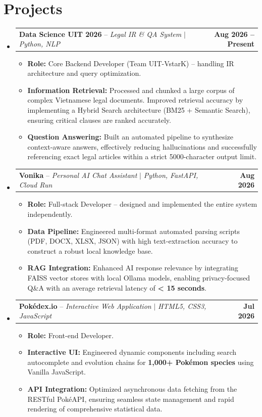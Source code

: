 \documentclass[letterpaper,11pt]{article}
\makeatletter
\newcommand{\resumeItem}[1]{
  \item\small{
    {#1 \vspace{-2pt}}
  }
}
\newcommand{\resumeProjectHeading}[2]{
    \item
    \begin{tabular*}{1.0\textwidth}{l@{\extracolsep{\fill}}r}
      \small#1 & \textbf{#2} \\
    \end{tabular*}\vspace{-7pt}
}
\newcommand{\resumeSubHeadingListStart}{\begin{itemize}[leftmargin=0.0in, label={}]}
\newcommand{\resumeSubHeadingListEnd}{\end{itemize}}
\newcommand{\resumeItemListStart}{\begin{itemize}}
\newcommand{\resumeItemListEnd}{\end{itemize}\vspace{-5pt}}
\makeatother
\begin{document}
\section{Projects}
    \resumeSubHeadingListStart
      \resumeProjectHeading
          {\textbf{Data Science UIT 2026} -- \emph{Legal IR \& QA System} $|$ \emph{Python, NLP}}{Aug 2026 -- Present}
          \resumeItemListStart
            \resumeItem{\textbf{Role:} Core Backend Developer (Team UIT-VstarK) -- handling IR architecture and query optimization.}
            \resumeItem{\textbf{Information Retrieval:} Processed and chunked a large corpus of complex Vietnamese legal documents. Improved retrieval accuracy by implementing a Hybrid Search architecture (BM25 + Semantic Search), ensuring critical clauses are ranked accurately.}
            \resumeItem{\textbf{Question Answering:} Built an automated pipeline to synthesize context-aware answers, effectively reducing hallucinations and successfully referencing exact legal articles within a strict 5000-character output limit.}
          \resumeItemListEnd
          
      \resumeProjectHeading
          {\textbf{Vonika} -- \emph{Personal AI Chat Assistant} $|$ \emph{Python, FastAPI, Cloud Run}}{Aug 2026}
          \resumeItemListStart
            \resumeItem{\textbf{Role:} Full-stack Developer -- designed and implemented the entire system independently.}
            \resumeItem{\textbf{Data Pipeline:} Engineered multi-format automated parsing scripts (PDF, DOCX, XLSX, JSON) with high text-extraction accuracy to construct a robust local knowledge base.}
            \resumeItem{\textbf{RAG Integration:} Enhanced AI response relevance by integrating FAISS vector stores with local Ollama models, enabling privacy-focused Q\&A with an average retrieval latency of \textbf{< 15 seconds}.}
          \resumeItemListEnd
          
      \resumeProjectHeading
          {\textbf{Pokédex.io} -- \emph{Interactive Web Application} $|$ \emph{HTML5, CSS3, JavaScript}}{Jul 2026}
          \resumeItemListStart
            \resumeItem{\textbf{Role:} Front-end Developer.}
            \resumeItem{\textbf{Interactive UI:} Engineered dynamic components including search autocomplete and evolution chains for \textbf{1,000+ Pokémon species} using Vanilla JavaScript.}
            \resumeItem{\textbf{API Integration:} Optimized asynchronous data fetching from the RESTful PokéAPI, ensuring seamless state management and rapid rendering of comprehensive statistical data.}
          \resumeItemListEnd
    \resumeSubHeadingListEnd
\end{document}
